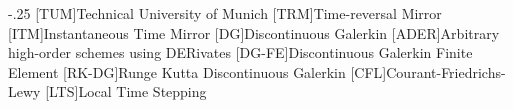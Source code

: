 \documentclass[headsepline,footsepline,footinclude=false,oneside,fontsize=11pt,paper=a4,listof=totoc,bibliography=totoc]{scrbook} %
\begin{document}


\frontmatter{}





\tableofcontents{}

\mainmatter{}










\appendix{}


\begin{acronym}
	\itemsep-.25\baselineskip
	[TUM]{Technical University of Munich}
	[TRM]{Time-reversal Mirror}
	[ITM]{Instantaneous Time Mirror}
	[DG]{Discontinuous Galerkin}
	[ADER]{Arbitrary high-order schemes using DERivates}
	[DG-FE]{Discontinuous Galerkin Finite Element}
	[RK-DG]{Runge Kutta Discontinuous Galerkin}
	[CFL]{Courant-Friedrichs-Lewy}
	[LTS]{Local Time Stepping}
\end{acronym}

\listoffigures{}
\listoftables{}
\printbibliography{}
\end{document}

